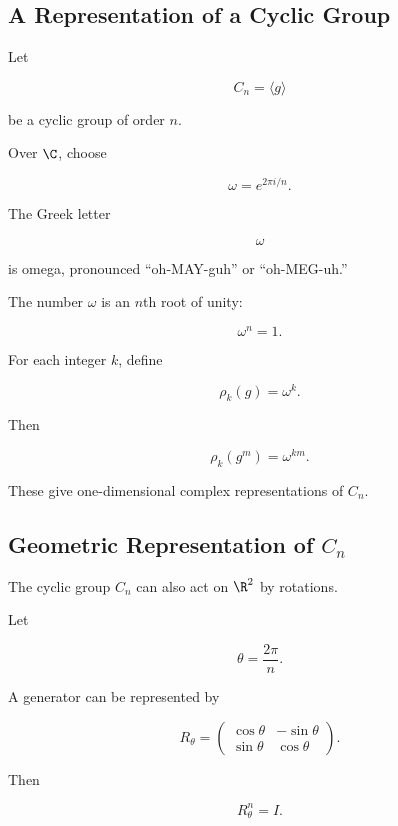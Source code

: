 \subsection{A Representation of a Cyclic Group}
\label{subsec:cyclic-group-representation}

Let

\[ C_n=\langle g\rangle \]

be a cyclic group of order \(n\).

Over \(\C\), choose

\[ \omega=e^{2\pi i/n}. \]

The Greek letter

\[ \omega \]

is omega, pronounced ``oh-MAY-guh'' or ``oh-MEG-uh.''

The number \(\omega\) is an \(n\)th root of unity:

\[ \omega^n=1. \]

For each integer \(k\), define

\[ \rho_k(g)=\omega^k. \]

Then

\[ \rho_k(g^m)=\omega^{km}. \]

These give one-dimensional complex representations of \(C_n\).

\subsection{Geometric Representation of \(C_n\)}
\label{subsec:cyclic-geometric-representation}

The cyclic group \(C_n\) can also act on \(\R^2\) by rotations.

Let

\[ \theta=\frac{2\pi}{n}. \]

A generator can be represented by

\[ R_\theta=
\begin{pmatrix}
\cos\theta&-\sin\theta\\
\sin\theta&\cos\theta
\end{pmatrix}. \]

Then

\[ R_\theta^n=I. \]

\begin{center}
\end{center}

